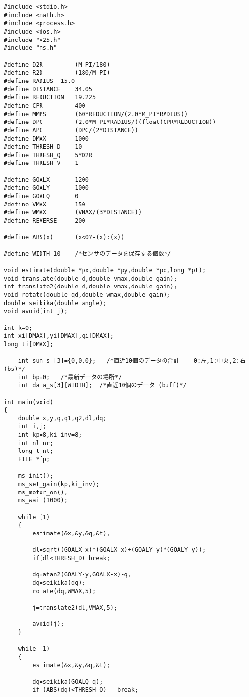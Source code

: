 \begin{lstlisting}[caption=演習22のプログラム,label=s22]
#include <stdio.h>
#include <math.h>
#include <process.h>
#include <dos.h>
#include "v25.h"
#include "ms.h"

#define D2R         (M_PI/180)
#define R2D         (180/M_PI)
#define RADIUS	15.0
#define DISTANCE    34.05
#define REDUCTION   19.225
#define CPR         400
#define MMPS        (60*REDUCTION/(2.0*M_PI*RADIUS))
#define DPC         (2.0*M_PI*RADIUS/((float)CPR*REDUCTION))
#define APC         (DPC/(2*DISTANCE))
#define DMAX        1000
#define THRESH_D    10
#define THRESH_Q    5*D2R
#define THRESH_V    1

#define GOALX       1200
#define GOALY       1000
#define GOALQ       0
#define VMAX        150
#define WMAX        (VMAX/(3*DISTANCE))
#define REVERSE     200

#define ABS(x)      (x<0?-(x):(x))

#define WIDTH 10    /*センサのデータを保存する個数*/

void estimate(double *px,double *py,double *pq,long *pt);
void translate(double d,double vmax,double gain);
int translate2(double d,double vmax,double gain);
void rotate(double qd,double wmax,double gain);
double seikika(double angle);
void avoid(int j);

int k=0;
int xi[DMAX],yi[DMAX],qi[DMAX];
long ti[DMAX];

    int sum_s [3]={0,0,0};   /*直近10個のデータの合計    0:左,1:中央,2:右(bs)*/
    int bp=0;   /*最新データの場所*/
    int data_s[3][WIDTH];  /*直近10個のデータ (buff)*/

int main(void)
{
    double x,y,q,q1,q2,dl,dq;
    int i,j;
    int kp=8,ki_inv=8;
    int nl,nr;
    long t,nt;
    FILE *fp;

    ms_init();
    ms_set_gain(kp,ki_inv);
    ms_motor_on();
    ms_wait(1000);

    while (1)
    {
        estimate(&x,&y,&q,&t);

        dl=sqrt((GOALX-x)*(GOALX-x)+(GOALY-y)*(GOALY-y));
        if(dl<THRESH_D) break;

        dq=atan2(GOALY-y,GOALX-x)-q;
        dq=seikika(dq);
        rotate(dq,WMAX,5);

        j=translate2(dl,VMAX,5);

        avoid(j);
    }

    while (1)
    {
        estimate(&x,&y,&q,&t);

        dq=seikika(GOALQ-q);
        if (ABS(dq)<THRESH_Q)   break;


\end{lstlisting}

